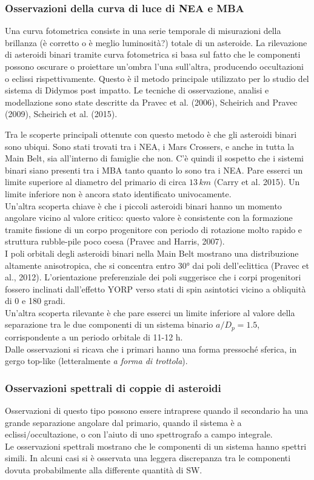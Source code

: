 \documentclass[a4paper,11pt,openright]{book}
\begin{document}
\subsubsection{Osservazioni della curva di luce di NEA e MBA}
Una curva fotometrica consiste in una serie temporale di misurazioni della brillanza (è corretto o è meglio luminosità?) totale di un asteroide. La rilevazione di asteroidi binari tramite curva fotometrica si basa sul fatto che le componenti possono oscurare o proiettare un'ombra l'una sull'altra, producendo occultazioni o eclissi rispettivamente. Questo è il metodo principale utilizzato per lo studio del sistema di Didymos post impatto. Le tecniche di osservazione, analisi e modellazione sono state descritte da Pravec et al. (2006), Scheirich and Pravec (2009), Scheirich et al. (2015).

Tra le scoperte principali ottenute con questo metodo è che gli asteroidi binari sono ubiqui. Sono stati trovati tra i NEA, i Mars Crossers, e anche in tutta la Main Belt, sia all'interno di famiglie che non. C'è quindi il sospetto che i sistemi binari siano presenti tra i MBA tanto quanto lo sono tra i NEA. Pare esserci un limite superiore al diametro del primario di circa $13\,km$ (Carry et al. 2015). Un limite inferiore non è ancora stato identificato univocamente.\\
Un'altra scoperta chiave è che i piccoli asteroidi binari hanno un momento angolare vicino al valore critico: questo valore è consistente con la formazione tramite fissione di un corpo progenitore con periodo di rotazione molto rapido e struttura rubble-pile poco coesa (Pravec and Harris, 2007).\\
I poli orbitali degli asteroidi binari nella Main Belt mostrano una distribuzione altamente anisotropica, che si concentra entro 30° dai poli dell'eclittica (Pravec et al., 2012). L'orientazione preferenziale dei poli suggerisce che i corpi progenitori fossero inclinati dall'effetto YORP verso stati di spin asintotici vicino a obliquità di 0 e 180 gradi.\\
Un'altra scoperta rilevante è che pare esserci un limite inferiore al valore della separazione tra le due componenti di un sistema binario $a/D_p=1.5$, corrispondente a un periodo orbitale di 11-12 h.\\
Dalle osservazioni si ricava che i primari hanno una forma pressoché sferica, in gergo top-like (letteralmente \textit{a forma di trottola}).

\subsubsection{Osservazioni spettrali di coppie di asteroidi}
Osservazioni di questo tipo possono essere intraprese quando il secondario ha una grande separazione angolare dal primario, quando il sistema è a eclissi/occultazione, o con l'aiuto di uno spettrografo a campo integrale.\\
Le osservazioni spettrali mostrano che le componenti di un sistema hanno spettri simili. In alcuni casi si è osservata una leggera discrepanza tra le componenti dovuta probabilmente alla differente quantità di SW.
\end{document}
